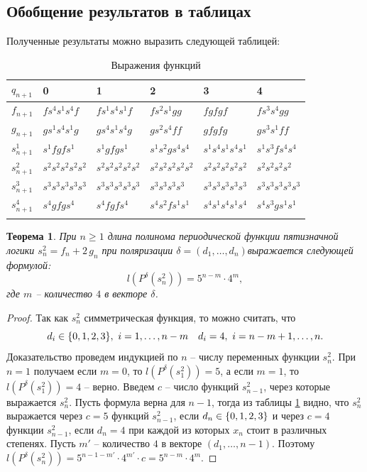 \documentclass[bibliography=totoc, a4paper, 14pt]{extarticle}
\newtheorem{myth}{Теорема}
\def\in{\mathchar"3232\nobreak\discretionary{}{\usefont{OMS}{cmsy}{m}{n}\char50}{}}
\begin{document}
\subsection{Обобщение результатов в таблицах}
Полученные результаты можно выразить следующей таблицей:
\begin{center}
\begin{longtable}[h]{| l | l | l | l | l | l |}

\hline $q_{n+1}$ & 0 & 1 & 2 & 3 & 4 \\
\hline

$f_{n+1}$ & $f s^4 s^1 s^4 f$ & $f s^1 s^4 s^1 f$ & $f s^2 s^1 g g$ & $f g f g f$ & $f s^3 s^4 g g$
\\ \hline

$g_{n+1}$ & $g s^1 s^4 s^1 g$ & $g s^4 s^1 s^4 g$ & $g s^2 s^4 f f$ & $g f g f g$ & $g s^3 s^1 f f$
\\ \hline

$s^1_{n+1}$ & $s^1 f g f s^1$ & $s^1 g f g s^1$ & $s^1 s^2 g s^4 s^4$ & $s^1 s^4 s^1 s^4 s^1$ & $s^1 s^3 f s^4 s^4$
\\ \hline

$s^2_{n+1}$ & $s^2 s^2 s^2 s^2 s^2$ & $s^2 s^2 s^2 s^2 s^2$ & $s^2 s^2 s^2 s^2 s^2$ & $s^2 s^2 s^2 s^2 s^2$ & $s^2 s^2 s^2 s^2$
\\ \hline

$s^3_{n+1}$ & $s^3 s^3 s^3 s^3 s^3$ & $s^3 s^3 s^3 s^3 s^3$ & $s^3 s^3 s^3 s^3$ & $s^3 s^3 s^3 s^3 s^3$ & $s^3 s^3 s^3 s^3 s^3$
\\ \hline

$s^4_{n+1}$ & $s^4 g f g s^4$ & $s^4 f g f s^4$ & $s^4 s^2 f s^1 s^1$ & $s^4 s^1 s^4 s^1 s^4$ & $s^4 s^3 g s^1 s^1$
\\ \hline

\caption{Выражения функций}
\label{functab}
\end{longtable}
\end{center}

\begin{myth}
\label{ths2}
При $n \geqslant 1$ длина полинома периодической функции пятизначной логики ${s^2_n = f_n + 2\,g_n}$
при поляризации $\delta = (d_1,\ldots,d_n)$выражается следующей формулой:
$$ l(P^{\delta}(s^2_n)) = 5^{n-m} \cdot 4^m ,$$
где $m$ -- количество $4$ в векторе $\delta$.
\end{myth}
\begin{proof}
Так как $s^2_n$ симметрическая функция, то можно считать, что
$$d_i \in \{0,1,2,3\},\ i=1,\dots,n-m \quad d_i = 4,\ i=n-m+1,\dots,n.$$
Доказательство проведем индукцией по $n$ -- числу переменных функции $s^2_n$.
При $n = 1$ получаем если $m=0$, то $l(P^{\delta}(s^2_1)) = 5$, а если $m=1$, то
$l(P^{\delta}(s^2_1))=4$ -- верно. Введем $c$ -- число функций $s^2_{n-1}$, через которые
выражается $s^2_n$. Пусть формула верна для ${n-1}$, тогда из таблицы \ref{functab} видно, что
$s^2_n$ выражается через $c=5$ функций $s^2_{n-1}$, если ${d_n \in \{0,1,2,3\}}$ и через $c=4$
функции $s^2_{n-1}$, если $d_n = 4$ при каждой из которых $x_n$ стоит в различных степенях.
Пусть $m'$ -- количество $4$ в векторе $(d_1,\dots,n-1)$.
Поэтому ${l(P^{\delta}(s^2_n)) = 5^{n-1-m'} \cdot 4^{m'} \cdot c = 5^{n-m}\cdot4^m}$.
\end{proof}
\end{document}
